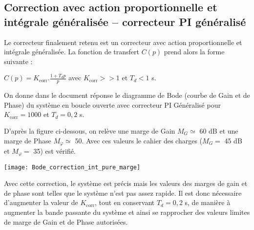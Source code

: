 \ifprof
\else
\subsection*{Correction avec action proportionnelle et intégrale généralisée -- correcteur PI généralisé}


Le correcteur finalement retenu est un correcteur avec action proportionnelle et intégrale généralisée. La fonction de transfert $C(p)$ prend alors la forme suivante :

{\centering
$C(p)= K_{\text{corr}} . \frac{1+T_d p}{p}$  avec $K_{\text{corr}} >> 1$ et $T_d < 1$ s.
\par}
On donne dans le document réponse le diagramme de Bode (courbe de Gain et de Phase) du système en boucle ouverte avec correcteur PI Généralisé pour $K_{\text{corr}} = \num{1000}$ et $T_d = 0,2$ s. 
\fi


\ifprof
\begin{corrige}
D'après la figure ci-dessous, on relève une marge de Gain $M_G \simeq$ 60 dB et une marge de Phase $M_{\varphi} \simeq$ 50\degre. Avec ces valeurs le cahier des charges ($M_G =$ 45 dB et $M_{\varphi} =$ 35\degre) est vérifié.
 
 
\begin{center}
      \texttt{[image: Bode\_correction\_int\_pure\_marge]}
\end{center}
\end{corrige}
\fi

\ifprof
\else
Avec cette correction, le système est précis mais les valeurs des marges de gain et de phase sont telles que le système n'est pas assez rapide. Il est donc nécessaire d'augmenter la valeur de $K_{\text{corr}}$, tout en conservant $T_d = 0,2$ s, de manière à augmenter la bande passante du système et ainsi se rapprocher des valeurs limites de marge de Gain et de Phase autorisées.
\fi

